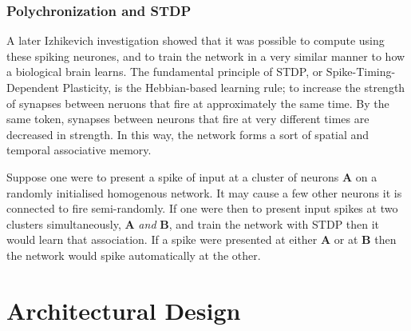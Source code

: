 \documentclass{acm_proc_article-sp}
\begin{document}
\subsubsection{Polychronization and STDP}
{
A later Izhikevich investigation\cite{izhikevich:polychron} showed that it was possible to compute using these spiking neurones, and to train the network in a very similar manner to how a biological brain learns. The fundamental principle of STDP, or Spike{}-Timing{}-Dependent Plasticity\cite{izhikevich:stdp}, is the Hebbian{}-based learning rule; to increase the strength of synapses between neruons that fire at approximately the same time. By the same token, synapses between neurons that fire at very different times are decreased in strength. In this way, the network forms a sort of spatial and temporal associative memory.

Suppose one were to present a spike of input at a cluster of neurons
{\textbf A} on a randomly initialised homogenous network. It may
cause a few other neurons it is connected to fire semi{}-randomly. If
one were then to present input spikes at two clusters simultaneously,
{\textbf A} {\textit {and}} {\textbf B}, and train the network with STDP
then it would learn that association. If a spike were presented at
either {\textbf A} or at {\textbf B} then the network would spike
automatically at the other.
}

\section{Architectural Design}
\end{document}
